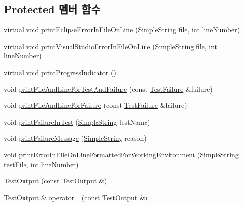 \subsection*{Protected 멤버 함수}
\begin{DoxyCompactItemize}
\item 
virtual void \hyperlink{class_test_output_aa2b6f28b76a53cac4059991bc3c86f79}{print\+Eclipse\+Error\+In\+File\+On\+Line} (\hyperlink{class_simple_string}{Simple\+String} file, int line\+Number)
\item 
virtual void \hyperlink{class_test_output_a0a0136e850e6b9a696ab84e5c416341a}{print\+Visual\+Studio\+Error\+In\+File\+On\+Line} (\hyperlink{class_simple_string}{Simple\+String} file, int line\+Number)
\item 
virtual void \hyperlink{class_test_output_a0cd44d3b6da1caa7b8d335ef7580a391}{print\+Progress\+Indicator} ()
\item 
void \hyperlink{class_test_output_ae20c439e68036cc705a86d9a95954168}{print\+File\+And\+Line\+For\+Test\+And\+Failure} (const \hyperlink{class_test_failure}{Test\+Failure} \&failure)
\item 
void \hyperlink{class_test_output_a1d78706f5181a464f5fafb178d231be9}{print\+File\+And\+Line\+For\+Failure} (const \hyperlink{class_test_failure}{Test\+Failure} \&failure)
\item 
void \hyperlink{class_test_output_a1748d410d65b95596df95234742258a3}{print\+Failure\+In\+Test} (\hyperlink{class_simple_string}{Simple\+String} test\+Name)
\item 
void \hyperlink{class_test_output_ab13cdfa930cc1ad29b36b1ab7ff77a99}{print\+Failure\+Message} (\hyperlink{class_simple_string}{Simple\+String} reason)
\item 
void \hyperlink{class_test_output_a56ae5964123fc91c7149a8274aa22db9}{print\+Error\+In\+File\+On\+Line\+Formatted\+For\+Working\+Environment} (\hyperlink{class_simple_string}{Simple\+String} test\+File, int line\+Number)
\item 
\hyperlink{class_test_output_a091587ca47473718825a82255d5810e1}{Test\+Output} (const \hyperlink{class_test_output}{Test\+Output} \&)
\item 
\hyperlink{class_test_output}{Test\+Output} \& \hyperlink{class_test_output_a99296d44c888753edbf1ab8c5ca4573e}{operator=} (const \hyperlink{class_test_output}{Test\+Output} \&)
\end{DoxyCompactItemize}
